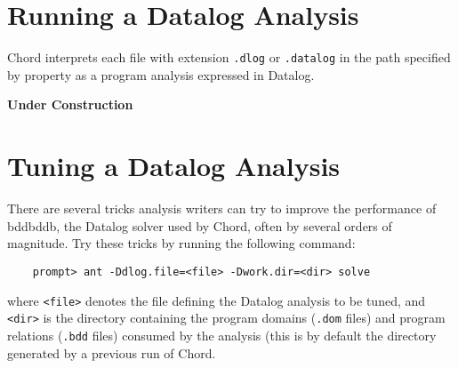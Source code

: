 \section{Running a Datalog Analysis}
\label{sec:running-datalog-analysis}

Chord interprets each file with extension {\tt .dlog} or {\tt .datalog} in the path specified by
property  as a program analysis expressed in Datalog.

{\bf Under Construction}

\section{Tuning a Datalog Analysis}
\label{sec:tuning-datalog-analysis}

There are several tricks analysis writers can try to improve the
performance of bddbddb, the Datalog solver used by Chord, often
by several orders of magnitude.
Try these tricks by running the following command:

\begin{verbatim}
    prompt> ant -Ddlog.file=<file> -Dwork.dir=<dir> solve
\end{verbatim}
where {\tt <file>} denotes the file defining the Datalog analysis
to be tuned, and {\tt <dir>} is the directory containing the
program domains ({\tt *.dom} files) and program relations ({\tt *.bdd} files)
consumed by the analysis (this is by default the
 directory generated
by a previous run of Chord.

